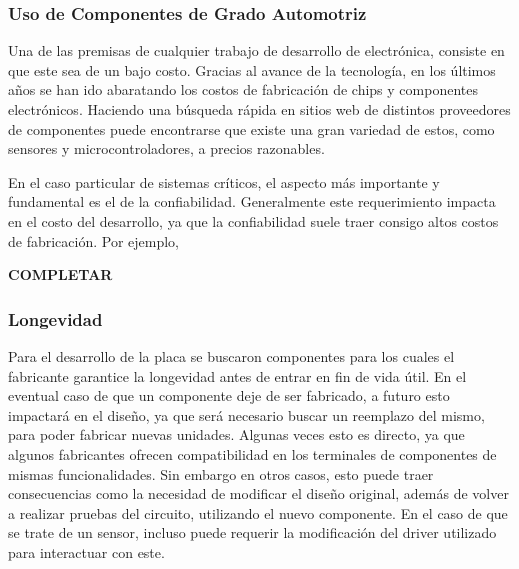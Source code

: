 \subsubsection{Uso de Componentes de Grado Automotriz}

Una de las premisas de cualquier trabajo de desarrollo de electrónica, consiste en que este sea de un bajo costo. Gracias al avance de la tecnología, en los últimos años se han ido abaratando los costos de fabricación de chips y componentes electrónicos. Haciendo una búsqueda rápida en sitios web de distintos proveedores de componentes puede encontrarse que existe una gran variedad de estos, como sensores y microcontroladores, a precios razonables.

En el caso particular de sistemas críticos, el aspecto más importante y fundamental es el de la confiabilidad. Generalmente este requerimiento impacta en el costo del desarrollo, ya que la confiabilidad suele traer consigo altos costos de fabricación. Por ejemplo, %


\textbf{{\color{red} COMPLETAR}}

\subsubsection{Longevidad}


Para el desarrollo de la placa se buscaron componentes para los cuales el fabricante garantice la longevidad antes de entrar en fin de vida útil. En el eventual caso de que un componente deje de ser fabricado, a futuro esto impactará en el diseño, ya que será necesario buscar un reemplazo del mismo, para poder fabricar nuevas unidades. Algunas veces esto es directo, ya que algunos fabricantes ofrecen compatibilidad en los terminales de componentes de mismas funcionalidades. Sin embargo en otros casos, esto puede traer consecuencias como la necesidad de modificar el diseño original, además de volver a realizar pruebas del circuito, utilizando el nuevo componente. En el caso de que se trate de un sensor, incluso puede requerir la modificación del driver utilizado para interactuar con este.

